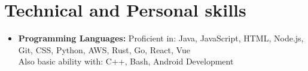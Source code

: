 \documentclass[11pt,a4paper,roman]{moderncv}        %
\begin{document}
\vspace{2pt}

\section{Technical and Personal skills}

\vspace{2pt}

\begin{itemize}

\item \textbf{Programming Languages:} Proficient in: Java, JavaScript, HTML, Node.js, Git, CSS, Python, AWS, Rust, Go, React, Vue \\ Also basic ability with: C++, Bash, Android Development

\vspace{2pt}

\end{itemize}

\vspace{2pt}

\nocite{*}



\end{document}
